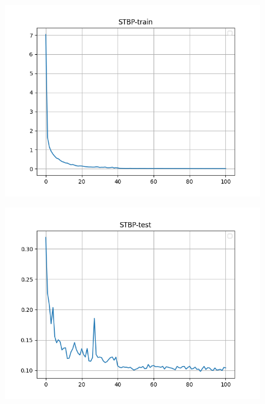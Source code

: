 \documentclass{beamer}
\begin{document}
\begin{frame}
    \begin{figure}[l]
        \centering
        \includegraphics[height=.9\textheight]{pic/STBP-train.png}
    \end{figure}
\end{frame}

\begin{frame}
    \begin{figure}[l]
        \centering
        \includegraphics[height=.9\textheight]{pic/STBP-test.png}
    \end{figure}
\end{frame}
\end{document}

